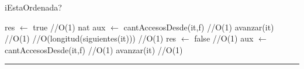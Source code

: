 \begin{algorithm}[H]
\caption{iEstaOrdenada?}
\begin{algorithmic}[1]
\state res $\gets$ true \hfill //O(1)
\state nat aux $\gets$ cantAccesosDesde(it,f) \hfill //O(1)
\state avanzar(it) \hfill //O(1)
 \hfill //O(longitud(siguientes(it)))
 \hfill //O(1)
\state res $\gets$ false \hfill //O(1)
\endif
\state aux $\gets$ cantAccesosDesde(it,f) \hfill //O(1)
\state avanzar(it) \hfill //O(1)
\endwhile
\EndFunction 
\end{algorithmic}
\hrule
{}
\end{algorithm}